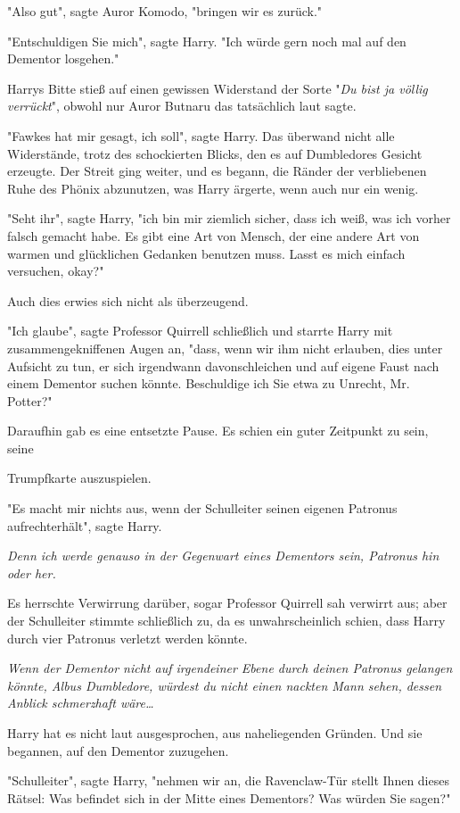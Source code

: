 {"Also gut", sagte Auror Komodo, "bringen wir es zurück."

"Entschuldigen Sie mich", sagte Harry. "Ich würde gern noch mal auf den Dementor losgehen."

Harrys Bitte stieß auf einen gewissen Widerstand der Sorte "\emph{Du bist ja völlig verrückt}", obwohl nur Auror Butnaru das tatsächlich laut sagte.

"Fawkes hat mir gesagt, ich soll", sagte Harry. Das überwand nicht alle Widerstände, trotz des schockierten Blicks, den es auf Dumbledores Gesicht erzeugte. Der Streit ging weiter, und es begann, die Ränder der verbliebenen Ruhe des Phönix abzunutzen, was Harry ärgerte, wenn auch nur ein wenig.

"Seht ihr", sagte Harry, "ich bin mir ziemlich sicher, dass ich weiß, was ich vorher falsch gemacht habe. Es gibt eine Art von Mensch, der eine andere Art von warmen und glücklichen Gedanken benutzen muss. Lasst es mich einfach versuchen, okay?"

Auch dies erwies sich nicht als überzeugend.

"Ich glaube", sagte Professor Quirrell schließlich und starrte Harry mit zusammengekniffenen Augen an, "dass, wenn wir ihm nicht erlauben, dies unter Aufsicht zu tun, er sich irgendwann davonschleichen und auf eigene Faust nach einem Dementor suchen könnte. Beschuldige ich Sie etwa zu Unrecht, Mr. Potter?"

Daraufhin gab es eine entsetzte Pause. Es schien ein guter Zeitpunkt zu sein, seine

Trumpfkarte auszuspielen.

"Es macht mir nichts aus, wenn der Schulleiter seinen eigenen Patronus aufrechterhält", sagte Harry.

\emph{Denn ich werde genauso in der Gegenwart eines Dementors sein, Patronus hin oder her.}

Es herrschte Verwirrung darüber, sogar Professor Quirrell sah verwirrt aus; aber der Schulleiter stimmte schließlich zu, da es unwahrscheinlich schien, dass Harry durch vier Patronus verletzt werden könnte.

\emph{Wenn der Dementor nicht auf irgendeiner Ebene durch deinen Patronus gelangen könnte, Albus Dumbledore, würdest du nicht einen nackten Mann sehen, dessen Anblick schmerzhaft wäre…}

Harry hat es nicht laut ausgesprochen, aus naheliegenden Gründen. Und sie begannen, auf den Dementor zuzugehen.

"Schulleiter", sagte Harry, "nehmen wir an, die Ravenclaw-Tür stellt Ihnen dieses Rätsel: Was befindet sich in der Mitte eines Dementors? Was würden Sie sagen?"

}

